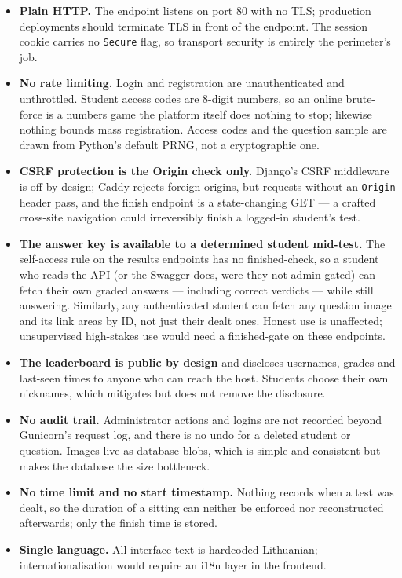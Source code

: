 \documentclass[11pt,a4paper]{article}
\newcommand{\code}[1]{\texttt{#1}}
\begin{document}
\begin{itemize}
  \item \textbf{Plain HTTP.} The endpoint listens on port 80 with no
        TLS; production deployments should terminate TLS in front of
        the endpoint. The session cookie carries no \code{Secure}
        flag, so transport security is entirely the perimeter's job.
  \item \textbf{No rate limiting.} Login and registration are
        unauthenticated and unthrottled. Student access codes are
        8-digit numbers, so an online brute-force is a numbers game
        the platform itself does nothing to stop; likewise nothing
        bounds mass registration. Access codes and the question
        sample are drawn from Python's default PRNG, not a
        cryptographic one.
  \item \textbf{CSRF protection is the Origin check only.} Django's
        CSRF middleware is off by design; Caddy rejects foreign
        origins, but requests without an \code{Origin} header pass,
        and the finish endpoint is a state-changing GET --- a crafted
        cross-site navigation could irreversibly finish a logged-in
        student's test.
  \item \textbf{The answer key is available to a determined student
        mid-test.} The self-access rule on the results endpoints has
        no finished-check, so a student who reads the API (or the
        Swagger docs, were they not admin-gated) can fetch their own
        graded answers --- including correct verdicts --- while still
        answering. Similarly, any authenticated student can fetch any
        question image and its link areas by ID, not just their dealt
        ones. Honest use is unaffected; unsupervised high-stakes use
        would need a finished-gate on these endpoints.
  \item \textbf{The leaderboard is public by design} and discloses
        usernames, grades and last-seen times to anyone who can reach
        the host. Students choose their own nicknames, which
        mitigates but does not remove the disclosure.
  \item \textbf{No audit trail.} Administrator actions and logins are
        not recorded beyond Gunicorn's request log, and there is no
        undo for a deleted student or question. Images live as
        database blobs, which is simple and consistent but makes the
        database the size bottleneck.
  \item \textbf{No time limit and no start timestamp.} Nothing records
        when a test was dealt, so the duration of a sitting can
        neither be enforced nor reconstructed afterwards; only the
        finish time is stored.
  \item \textbf{Single language.} All interface text is hardcoded
        Lithuanian; internationalisation would require an i18n layer
        in the frontend.
\end{itemize}
\end{document}
